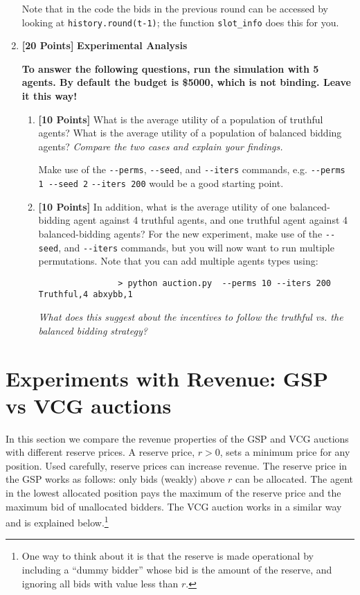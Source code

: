 \documentclass[11pt]{article}
\newcommand{\points}[1]{\textbf{[#1 Points]}}
\begin{document}
\begin{enumerate}
        Note that in the code the bids in the previous round can be accessed by looking at \texttt{history.round(t-1)}; the function \texttt{slot\_info} does this for you.

		\item \points{20} {\bf Experimental Analysis}

{\bf 			To answer the following questions, run the
			simulation with 5 agents. By default the
			budget is \$5000, which is 
not binding. Leave it
			this way!}
		
			\begin{enumerate}			
				\item \points{10} What is the average utility of a population of truthful agents? What is the average utility of a population of balanced bidding agents? {\em  Compare the two cases and explain your findings.}


				Make use of the \verb+--perms+, \verb+--seed+, and \verb+--iters+ commands, e.g. \verb+--perms 1 --seed 2+ \verb+--iters 200+ would be a good starting point.

				\item \points{10} In addition, what is the
average utility of one balanced-bidding agent against 4 truthful agents, and
one truthful agent against 4 balanced-bidding agents?
For the new experiment,
make use of the \verb+--seed+, and \verb+--iters+ commands, but you will now
want to run multiple permutations. Note that you can add multiple agents types using:
			\begin{verbatim}
				> python auction.py  --perms 10 --iters 200 Truthful,4 abxybb,1
			\end{verbatim}
%

{\em What does this suggest about the incentives to follow the truthful vs. the balanced bidding strategy?}
			\end{enumerate}

\end{enumerate}

\section{Experiments with Revenue: GSP vs VCG auctions}

In this section we compare the revenue properties of the GSP and VCG
auctions with different reserve prices.
%
A reserve price, $r>0$, sets a minimum price for any position.  Used
carefully, reserve prices can increase revenue.  
%
The reserve price in the GSP works as follows: only bids (weakly)
above $r$ can be allocated.  The agent in the lowest allocated
position pays the maximum of the reserve price and the maximum bid of
unallocated bidders. The VCG auction works in a similar way and is
explained below.\footnote{One way to think about it is that the
  reserve is made operational by including a ``dummy bidder'' whose
  bid is the amount of the reserve, and ignoring all bids with value
  less than $r$.}
\end{document}
